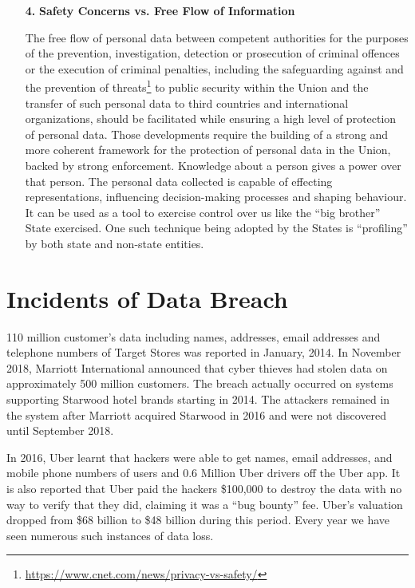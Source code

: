 \begin{multicols}{2}
\begin{itemize}
\item[{\bf 4.}] \textbf{Safety Concerns vs. Free Flow of Information}

The free flow of personal data between competent authorities for the purposes of the prevention, investigation, detection or prosecution of criminal offences or the execution of criminal penalties, including the safeguarding against and the prevention of threats\footnote{\url{https://www.cnet.com/news/privacy-vs-safety/}} to public security within the Union and the transfer of such personal data to third countries and international organizations, should be facilitated while ensuring a high level of protection of personal data. Those developments require the building of a strong and more coherent framework for the protection of personal data in the Union, backed by strong enforcement.  Knowledge about a person gives a power over that person. The personal data collected is capable of effecting representations, influencing decision-making processes and shaping behaviour. It can be used as a tool to exercise control over us like the “big brother” State exercised. One such technique being adopted by the States is “profiling” by both state and non-state entities.

\end{itemize}

\section{Incidents of Data Breach}

110 million customer’s data including names, addresses, email addresses and telephone numbers of Target Stores was reported in January, 2014. In November 2018, Marriott International announced that cyber thieves had stolen data on approximately 500 million customers. The breach actually occurred on systems supporting Starwood hotel brands starting in 2014. The attackers remained in the system after Marriott acquired Starwood in 2016 and were not discovered until September 2018.

In 2016, Uber learnt that hackers were able to get names, email addresses, and mobile phone numbers of users and 0.6 Million Uber drivers off the Uber app. It is also reported that Uber paid the hackers \$100,000 to destroy the data with no way to verify that they did, claiming it was a “bug bounty” fee. Uber’s valuation dropped from \$68 billion to \$48 billion during this period. Every year we have seen numerous such instances of data loss.


\end{multicols}
